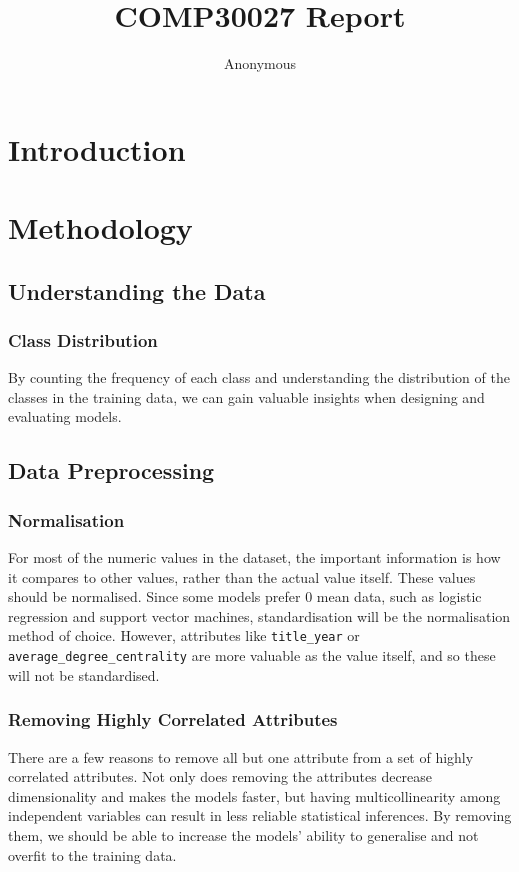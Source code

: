 \documentclass[11pt]{article}
\title{COMP30027 Report}
\author
{Anonymous}
\begin{document}
\maketitle



\section{Introduction}


\section{Methodology}

\subsection{Understanding the Data}
\subsubsection{Class Distribution} 
By counting the frequency of each class and understanding the distribution of the classes in the training data, we can gain valuable insights when designing and evaluating models.

\subsection{Data Preprocessing}

\subsubsection{Normalisation}
For most of the numeric values in the dataset, the important information is how it compares to other values, rather than the actual value itself. These values should be normalised. Since some models prefer 0 mean data, such as logistic regression and support vector machines, standardisation will be the normalisation method of choice. However, attributes like \texttt{title\_year} or \texttt{average\_degree\_centrality} are more valuable as the value itself, and so these will not be standardised.

\subsubsection{Removing Highly Correlated Attributes}
There are a few reasons to remove all but one attribute from a set of highly correlated attributes. Not only does removing the attributes decrease dimensionality and makes the models faster, but having multicollinearity among independent variables can result in less reliable statistical inferences. By removing them, we should be able to increase the models' ability to generalise and not overfit to the training data.
\end{document}
